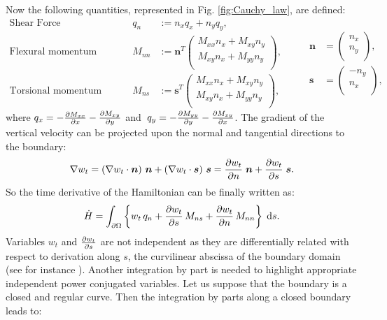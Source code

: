 \documentclass[preprint,12pt]{elsarticle}
\begin{document}
Now the following quantities, represented in Fig. \ref{fig:Cauchy_law}, are defined: 
\begin{equation}
\label{eq:QnMnnMns}
\begin{aligned}
\text{Shear Force}& \; \; \quad &q_{n} &:= n_x q_x + n_y q_y,   \\
\text{Flexural momentum}& \quad 
&M_{nn} &:= \bm{n}^T	
\begin{pmatrix}
M_{xx} n_x + M_{xy} n_y \\
M_{xy} n_x + M_{yy} n_y \\
\end{pmatrix}, \\
\text{Torsional momentum}& \quad &M_{ns} &:= \bm{s}^T	
\begin{pmatrix}
M_{xx} n_x + M_{xy} n_y \\
M_{xy} n_x + M_{yy} n_y \\
\end{pmatrix}, 
\end{aligned} \qquad
\begin{aligned}
\bm{n} &= 
\begin{pmatrix}
n_x \\
n_y \\
\end{pmatrix}, \\
\bm{s} &= 
\begin{pmatrix}
-n_y \\
n_x \\
\end{pmatrix},
\end{aligned}
\end{equation}
where $q_x = - \diffp{M_{xx}}{x} -\diffp{M_{xy}}{y}$ and $\; q_y = - \diffp{M_{yy}}{y} -\diffp{M_{xy}}{x}$. The gradient of the vertical velocity can be projected upon the normal and tangential directions to the boundary:
\begin{equation}
\label{eq:gr_dec_ns}
\nabla w_t = \left(\nabla w_t \cdot \bm{n} \right) \,\bm{n} + \left(\nabla w_t \cdot \bm{s} \right) \, \bm{s} = \diffp{w_t}{n} \; \bm{n} +   \diffp{w_t}{s} \; \bm{s}.
\end{equation}
So the time derivative of the Hamiltonian can be finally written as:
\begin{equation}
\dot{H} = \int_{\partial \Omega} \left\{ w_t \, q_n + \diffp{w_t}{s} \, M_{ns} + \diffp{w_t}{n} \, M_{nn}\right\} \d{s}.
\end{equation}
{Variables $w_t$ and $\diffp{w_t}{s}$ are not independent as they are differentially related with respect to derivation along $s$, the curvilinear abscissa of the boundary domain (see for instance \cite{timoshenko1959theory})}. Another integration by part is needed to highlight appropriate {independent} power conjugated variables. Let us suppose that the boundary is a closed and regular curve. Then the integration by parts along a closed boundary leads to:
\end{document}

